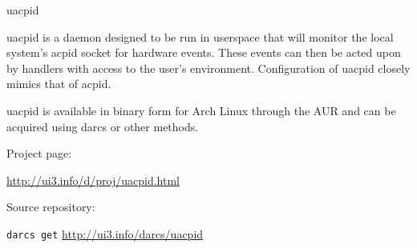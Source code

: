 \documentclass{scrreprt}
\begin{document}
\begin{hcarentry}{uacpid}
\makeheader

uacpid is a daemon designed to be run in userspace that will monitor the local system's acpid socket for hardware events. These events can then be acted upon by handlers with access to the user's environment. Configuration of uacpid closely mimics that of acpid.

uacpid is available in binary form for Arch Linux through the AUR and can be acquired using darcs or other methods.

\FurtherReading
\begin{compactitem}
\item Project page:

\url{http://ui3.info/d/proj/uacpid.html}

\item Source repository:

\texttt{darcs get} \url{http://ui3.info/darcs/uacpid}
\end{compactitem}

\end{hcarentry}
\end{document}
